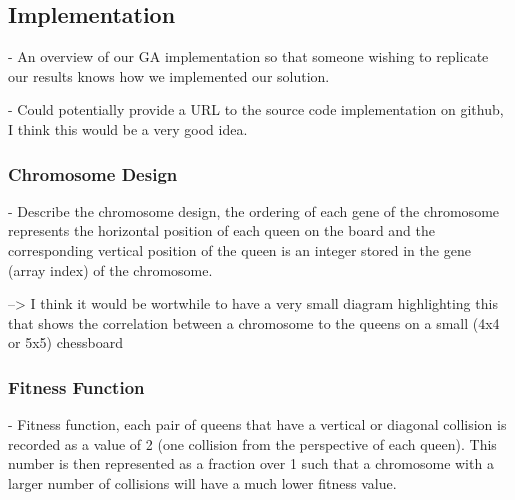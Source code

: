 \documentclass{sig-alternate}
\begin{document}
\subsection{Implementation}

- An overview of our GA implementation so that someone wishing to replicate our 
  results knows how we implemented our solution. 

- Could potentially provide a URL to the source code implementation on github, I think
  this would be a very good idea.


\subsubsection{Chromosome Design}
- Describe the chromosome design, the ordering of each gene of the chromosome represents
  the horizontal position of each queen on the board and the corresponding vertical
  position of the queen is an integer stored in the gene (array index) of the chromosome.

  --> I think it would be wortwhile to have a very small diagram highlighting this that shows
      the correlation between a chromosome to the queens on a small (4x4 or 5x5) chessboard

\subsubsection{Fitness Function}
- Fitness function, each pair of queens that have a vertical or diagonal collision is 
  recorded as a value of 2 (one collision from the perspective of each queen). This number 
  is then represented  as a fraction over 1 such that a chromosome with a larger number of
  collisions will have a much lower fitness value.
  
\end{document}
